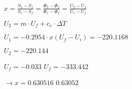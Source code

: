 \( x = \frac{S_{2} - S_{f}}{S_{s} - S_{f}} = \frac{\Phi_{2} - \Phi_{f}}{\Phi_{s} - \Phi_{f}} = \frac{U_{2} - U_{f}}{U_{s} - U_{f}} \)  

\( U_{2} = m \cdot U_{f} + c_{v} \cdot \Delta T \)  

\( U_{1} = -0.2954 \cdot x(U_{f} - U_{i}) = -220.1168 \)  

\( U_{2} = -220.144 \)  

\( U_{f} = -0.033 \)  
\( U_{f} = -333.442 \)  

\( \rightarrow x = 0.630516 \)  
\( 0.63052 \)